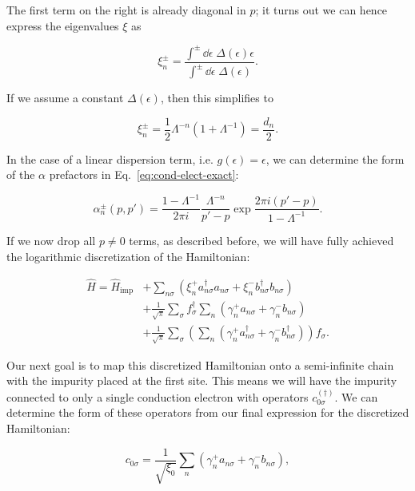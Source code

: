 The first term on the right is already diagonal in $p$; it turns out we can hence express the eigenvalues $\xi$ as

\begin{equation}
  \xi^{\pm}_n = \frac{\int^{\pm }\dd\epsilon \; \Delta(\epsilon)\epsilon}{\int^{\pm }\dd\epsilon \; \Delta(\epsilon)}.\label{eq:xi-exact}
\end{equation}

If we assume a constant $\Delta(\epsilon)$, then this simplifies to

\begin{equation}
  \xi^{\pm}_n = \frac{1}{2}\Lambda^{-n}(1 + \Lambda^{-1}) = \frac{d_n}{2}.
\end{equation}

In the case of a linear dispersion term, i.e. $g(\epsilon) = \epsilon$, we can determine the form of the $\alpha$ prefactors in Eq.~\eqref{eq:cond-elect-exact}:

\begin{equation}
  \alpha^{\pm}_n(p,p') = \frac{1 - \Lambda^{-1}}{2\pi i}\frac{\Lambda^{-n}}{p'-p} \exp{\frac{2\pi i(p'-p)}{1 - \Lambda^{-1}}}.
\end{equation}

If we now drop all $p \neq 0$ terms, as described before, we will have fully achieved the logarithmic discretization of the Hamiltonian:

\begin{align}
  \hat{H} = \hat{H}_{\mathrm{imp}} &+ \sum_{n\sigma} \left( \xi^+_n a^\dagger_{n\sigma}a_{n\sigma} + \xi^-_n b^\dagger_{n\sigma}b_{n\sigma} \right) \\
          &+ \frac{1}{\sqrt{\pi}}\sum_\sigma f^\dagger_\sigma \sum_n \left( \gamma^+_n a_{n\sigma} + \gamma^-_n b_{n\sigma} \right) \\
          &+ \frac{1}{\sqrt{\pi}} \sum_\sigma \left( \sum_n \left( \gamma^+_n a^\dagger_{n\sigma} + \gamma^-_n b^\dagger_{n\sigma} \right) \right)f_\sigma.
\end{align}

Our next goal is to map this discretized Hamiltonian onto a semi-infinite chain with the impurity placed at the first site. This means we will have the impurity connected to only a single conduction electron with operators $c^{(\dagger)}_{0\sigma}$. We can determine the form of these operators from our final expression for the discretized Hamiltonian:

\begin{equation}
  c_{0\sigma} = \frac{1}{\sqrt{\xi_0}} \sum_n \left( \gamma^+_n a_{n\sigma} + \gamma^-_n b_{n\sigma} \right),
\end{equation}

